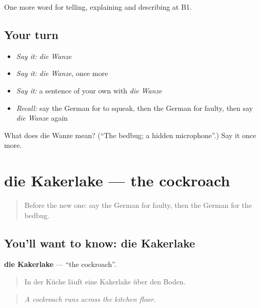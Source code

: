 \begin{grammarlens}[title={What you've built}]
One more word for telling, explaining and describing at B1.
\end{grammarlens}

\subsection*{Your turn}
\begin{itemize}
\raggedright
  \item \emph{Say it:} \emph{die Wanze}
  \item \emph{Say it:} \emph{die Wanze}, once more
  \item \emph{Say it:} a sentence of your own with \emph{die Wanze}
  \item \emph{Recall:} say the German for to squeak, then the German for faulty, then say \emph{die Wanze} again
\end{itemize}

\begin{tcolorbox}[breakable,colback=teal!4,colframe=teal!35!black,title={Before you move on}]
What does die Wanze mean? (\textquotedblleft{}The bedbug; a hidden microphone\textquotedblright{}.) Say it once more.
\end{tcolorbox}
\section[die Kakerlake]{die Kakerlake — the cockroach}

\label{lesson:GE-C430-kakerlake}



\begin{quote}
Before the new one: say the German for faulty, then the German for the bedbug.
\end{quote}

\subsection*{You'll want to know: die Kakerlake}
\textbf{die Kakerlake} — \textquotedblleft{}the cockroach\textquotedblright{}.

\begin{quote}
In der Küche läuft eine Kakerlake über den Boden.
\end{quote}

\begin{quote}
\emph{A cockroach runs across the kitchen floor.}
\end{quote}

